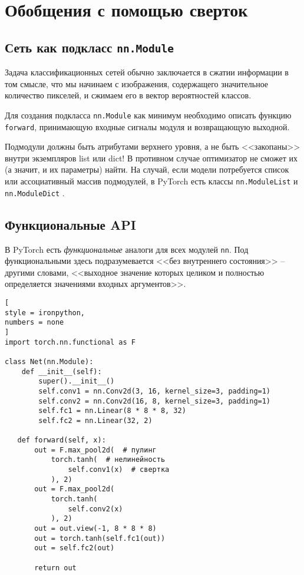 \documentclass[%
	11pt,
	a4paper,
	utf8,
		]{article}
\begin{document}
\section{Обобщения с помощью сверток}

\subsection{Сеть как подкласс \texttt{nn.Module}}

Задача классификационных сетей обычно заключается в сжатии информации в том смысле, что мы начинаем с изображения, содержащего значительное количество пикселей, и сжимаем его в вектор вероятностей классов.

Для создания подкласса \verb|nn.Module| как минимум необходимо описать функцию \verb|forward|, принимающую входные сигналы модуля и возвращающую выходной.

Подмодули должны быть атрибутами верхнего уровня, а не быть <<закопаны>> внутри экземпляров list или dict! В противном случае оптимизатор не сможет их (а значит, и их параметры) найти. На случай, если модели потребуется список или ассоциативный массив подмодулей, в PyTorch есть классы \verb|nn.ModuleList| и \verb|nn.ModuleDict| \cite[]{pytorch-2022}. 

\subsection{Функциональные API}

В PyTorch есть \emph{функциональные} аналоги для всех модулей \verb|nn|. Под функциональными здесь подразумевается <<без внутреннего состояния>> -- другими словами, <<выходное значение которых целиком и полностью определяется значениями входных аргументов>>. 

\begin{lstlisting}[
style = ironpython,
numbers = none
]
import torch.nn.functional as F

class Net(nn.Module):
    def __init__(self):
        super().__init__()
        self.conv1 = nn.Conv2d(3, 16, kernel_size=3, padding=1)
        self.conv2 = nn.Conv2d(16, 8, kernel_size=3, padding=1)
        self.fc1 = nn.Linear(8 * 8 * 8, 32)
        self.fc2 = nn.Linear(32, 2)
        
   def forward(self, x):
       out = F.max_pool2d(  # пулинг
           torch.tanh(  # нелинейность
               self.conv1(x)  # свертка
           ), 2)
       out = F.max_pool2d(
           torch.tanh(
               self.conv2(x)
           ), 2)
       out = out.view(-1, 8 * 8 * 8)
       out = torch.tanh(self.fc1(out))
       out = self.fc2(out)
       
       return out
\end{lstlisting}
\end{document}
